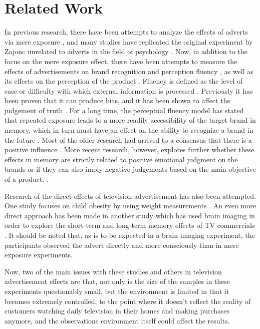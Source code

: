 \documentclass[review]{elsarticle}
\begin{document}
\section{Related Work}
\label{related}

In previous research, there have been attempts to analyze the effects of adverts via mere exposure \cite{hekkert}, and many studies have replicated the original experiment by Zajonc unrelated to adverts in the field of psychology \cite{huang,dechene}. Now, in addition to the focus on the mere exposure effect, there have been attempts to measure the effects of advertisements on brand recognition and perception fluency \cite{fang}, as well as its effects on the perception of the product \cite{gmuer}. Fluency is defined as the level of ease or difficulty with which external information is processed \cite{schwarz}. Previously it has been proven that it can produce bias, and it has been shown to affect the judgement of truth \cite{silva}. For a long time, the perceptual fluency model has stated that repeated exposure leads to a more readily accessibility of the target brand in memory, which in turn must have an effect on the ability to recognize a brand in the future \cite[e.g.][]{jacoby}. Most of the older research had arrived to a consensus that there is a positive influence \cite{reber, seamon}. More recent research, however, explores further whether these effects in memory are strictly related to positive emotional judgment on the brands or if they can also imply negative judgements based on the main objective of a product. \cite{lee-a}. 

Research of the direct effects of television advertisement has also been attempted. One study focuses on child obesity by using weight measurements \cite{boyland}. An even more direct approach has been made in another study which has used brain imaging in order to explore the short-term and long-term memory effects of TV commercials \cite{rossiter}. It should be noted that, as is to be expected in a brain imaging experiment, the participants observed the advert directly and more consciously than in mere exposure experiments. 

Now, two of the main issues with these studies and others in television advertisement effects are that, not only is the size of the samples in these experiments questionably small, but the environment is limited in that it becomes extremely controlled, to the point where it doesn't reflect the reality of customers watching daily television in their homes and making purchases anymore, and the observations environment itself could affect the results. 
\end{document}
